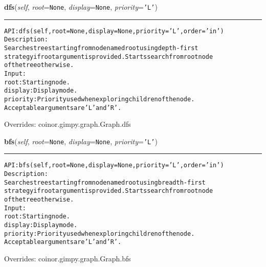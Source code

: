     \vspace{0.5ex}

\hspace{.8\funcindent}\begin{boxedminipage}{\funcwidth}

    \raggedright \textbf{dfs}(\textit{self}, \textit{root}={\tt None}, \textit{display}={\tt None}, \textit{priority}={\tt \texttt{'}\texttt{L}\texttt{'}})

    \vspace{-1.5ex}

    \rule{\textwidth}{0.5\fboxrule}
\setlength{\parskip}{2ex}
\begin{alltt}

API: dfs(self, root=None, display=None, priority='L', order='in')
Description:
    Searches tree starting from node named root using depth-first
    strategy if root argument is provided. Starts search from root node
    of the tree otherwise.
Input:
    root: Starting node.
    display: Display mode.
    priority: Priority used when exploring children of the node.
    Acceptable arguments are 'L' and 'R'.
\end{alltt}

\setlength{\parskip}{1ex}
      Overrides: coinor.gimpy.graph.Graph.dfs

    \end{boxedminipage}

    \vspace{0.5ex}

\hspace{.8\funcindent}\begin{boxedminipage}{\funcwidth}

    \raggedright \textbf{bfs}(\textit{self}, \textit{root}={\tt None}, \textit{display}={\tt None}, \textit{priority}={\tt \texttt{'}\texttt{L}\texttt{'}})

    \vspace{-1.5ex}

    \rule{\textwidth}{0.5\fboxrule}
\setlength{\parskip}{2ex}
\begin{alltt}

API: bfs(self, root=None, display=None, priority='L', order='in')
Description:
    Searches tree starting from node named root using breadth-first
    strategy if root argument is provided. Starts search from root node
    of the tree otherwise.
Input:
    root: Starting node.
    display: Display mode.
    priority: Priority used when exploring children of the node.
    Acceptable arguments are 'L' and 'R'.
\end{alltt}

\setlength{\parskip}{1ex}
      Overrides: coinor.gimpy.graph.Graph.bfs

    \end{boxedminipage}

